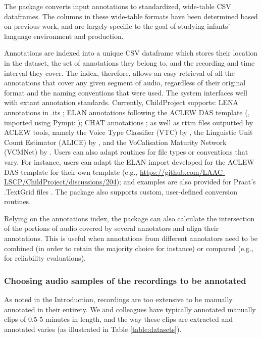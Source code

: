 \documentclass[smallextended]{svjour3}       %
\begin{document}
The package converts input annotations to standardized, wide-table CSV dataframes. The columns in these wide-table formats have been determined based on previous work, and are largely specific to the goal of studying infants' language environment and production.

Annotations are indexed into a unique CSV dataframe which stores their location in the dataset, the set of annotations they belong to, and the recording and time interval they cover. The index, therefore, allows an easy retrieval of all the annotations that cover any given segment of audio, regardless of their original format and the naming conventions that were used. The system interfaces well with extant annotation standards. Currently, ChildProject supports: LENA annotations in .its \citep{xu2008lenatm}; ELAN annotations following the ACLEW DAS template  (\citealt{Casillas2017}, imported using Pympi: \citealt{pympi-1.70}); CHAT annotations \citep{MacWhinney2000}; as well as rttm files outputted by ACLEW tools, namely the Voice Type Classifier (VTC) by \citet{lavechin2020opensource}, the Linguistic Unit Count Estimator (ALICE) by \citet{rasanen2020}, and the VoCalisation Maturity Network (VCMNet) by \citet{AlFutaisi2019}. Users can also adapt routines for file types or conventions that vary. For instance, users can adapt the ELAN import developed for the ACLEW DAS template for their own template (e.g., \url{https://github.com/LAAC-LSCP/ChildProject/discussions/204}); and examples are also provided for Praat's .TextGrid files \citep{boersma2006praat}. The package also supports custom, user-defined conversion routines.

Relying on the annotations index, the package can also calculate the intersection of the portions of audio covered by several annotators and align their annotations. This is useful when annotations from different annotators need to be combined (in order to retain the majority choice for instance) or compared (e.g., for reliability evaluations).

\subsubsection*{Choosing audio samples of the recordings to be annotated}\label{section:choosing}

As noted in the Introduction, recordings are too extensive to be manually annotated in their entirety. We and colleagues have typically annotated manually clips of 0.5-5 minutes in length, and the way these clips are extracted and annotated varies (as illustrated in Table \ref{table:datasets}).
\end{document}
